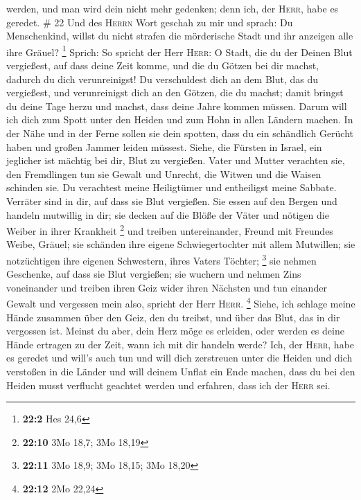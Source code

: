 werden, und man wird dein nicht mehr gedenken; denn ich, der
\textsc{Herr}, habe es geredet. \# 22  Und des
\textsc{Herrn} Wort geschah zu mir und sprach:  Du
Menschenkind, willst du nicht strafen die mörderische Stadt und ihr
anzeigen alle ihre Gräuel? \footnote{\textbf{22:2} Hes 24,6}
 Sprich: So spricht der Herr \textsc{Herr}: O Stadt, die
du der Deinen Blut vergießest, auf dass deine Zeit komme, und die du
Götzen bei dir machst, dadurch du dich verunreinigst!  Du
verschuldest dich an dem Blut, das du vergießest, und verunreinigst dich
an den Götzen, die du machst; damit bringst du deine Tage herzu und
machst, dass deine Jahre kommen müssen. Darum will ich dich zum Spott
unter den Heiden und zum Hohn in allen Ländern machen.  In
der Nähe und in der Ferne sollen sie dein spotten, dass du ein
schändlich Gerücht haben und großen Jammer leiden müssest.
 Siehe, die Fürsten in Israel, ein jeglicher ist mächtig
bei dir, Blut zu vergießen.  Vater und Mutter verachten
sie, den Fremdlingen tun sie Gewalt und Unrecht, die Witwen und die
Waisen schinden sie.  Du verachtest meine Heiligtümer und
entheiligst meine Sabbate.  Verräter sind in dir, auf dass
sie Blut vergießen. Sie essen auf den Bergen und handeln mutwillig in
dir;  sie decken auf die Blöße der Väter und nötigen die
Weiber in ihrer Krankheit \footnote{\textbf{22:10} 3Mo 18,7; 3Mo 18,19}
 und treiben untereinander, Freund mit Freundes Weibe,
Gräuel; sie schänden ihre eigene Schwiegertochter mit allem Mutwillen;
sie notzüchtigen ihre eigenen Schwestern, ihres Vaters Töchter;
\footnote{\textbf{22:11} 3Mo 18,9; 3Mo 18,15; 3Mo 18,20} 
sie nehmen Geschenke, auf dass sie Blut vergießen; sie wuchern und
nehmen Zins voneinander und treiben ihren Geiz wider ihren Nächsten und
tun einander Gewalt und vergessen mein also, spricht der Herr
\textsc{Herr}. \footnote{\textbf{22:12} 2Mo 22,24} 
Siehe, ich schlage meine Hände zusammen über den Geiz, den du treibst,
und über das Blut, das in dir vergossen ist.  Meinst du
aber, dein Herz möge es erleiden, oder werden es deine Hände ertragen zu
der Zeit, wann ich mit dir handeln werde? Ich, der \textsc{Herr}, habe
es geredet und will's auch tun  und will dich zerstreuen
unter die Heiden und dich verstoßen in die Länder und will deinem Unflat
ein Ende machen,  dass du bei den Heiden musst verflucht
geachtet werden und erfahren, dass ich der \textsc{Herr} sei.
